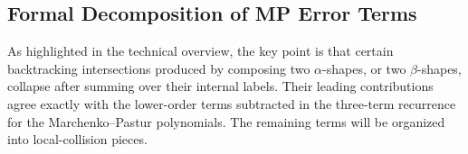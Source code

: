 \documentclass[12pt]{article}
\newcommand{\calP}{\mathcal{P}}
\newcommand{\q}{\mathfrak q}
\begin{document}
%
%
%


\subsection{Formal Decomposition of MP Error Terms}

As highlighted in the technical overview, the key point is that certain
backtracking intersections produced by composing two \(\alpha\)-shapes, or
two \(\beta\)-shapes, collapse after summing over their internal labels.
Their leading contributions agree exactly with the lower-order terms
subtracted in the three-term recurrence for the Marchenko--Pastur
polynomials. The remaining terms will be organized into local-collision
pieces.
\end{document}
